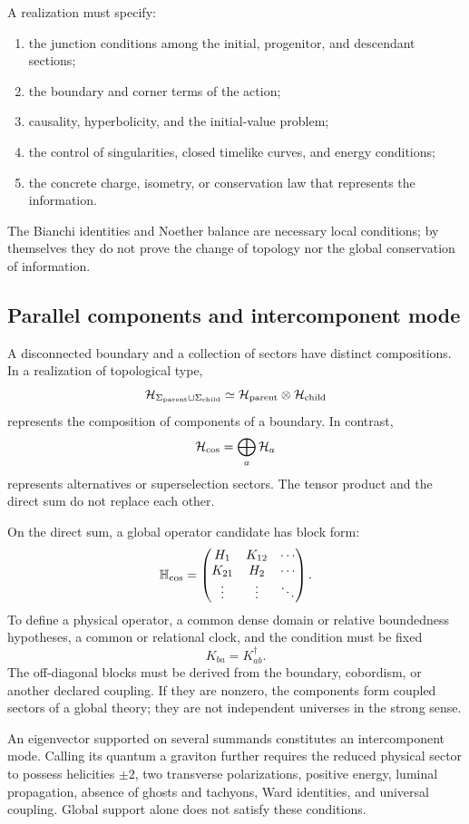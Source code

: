 A realization must specify:
\begin{enumerate}
 \item the junction conditions among the initial, progenitor, and
 descendant sections;
 \item the boundary and corner terms of the action;
 \item causality, hyperbolicity, and the initial-value problem;
 \item the control of singularities, closed timelike curves, and energy
 conditions;
 \item the concrete charge, isometry, or conservation law that represents the
 information.
\end{enumerate}
The Bianchi identities and Noether balance are necessary local
conditions; by themselves they do not prove the change of topology nor the
global conservation of information.

\subsection{Parallel components and intercomponent mode}
\label{sec:componentes-cosmologicas-paralelas}

A disconnected boundary and a collection of sectors have distinct
compositions. In a realization of topological type,
\[
 \mathcal H_{\Sigma_{\rm parent}\sqcup\Sigma_{\rm child}}
 \simeq
 \mathcal H_{\rm parent}\otimes\mathcal H_{\rm child}
\]
represents the composition of components of a boundary. In contrast,
\[
 \mathcal H_{\rm cos}
 =\bigoplus_a\mathcal H_a
\]
represents alternatives or superselection sectors. The tensor product
and the direct sum do not replace each other.

On the direct sum, a global operator candidate has block form:
\[
 \mathbb H_{\rm cos}
 =
 \begin{pmatrix}
 H_1&K_{12}&\cdots\\
 K_{21}&H_2&\cdots\\
 \vdots&\vdots&\ddots
 \end{pmatrix}.
\]
To define a physical operator, a common dense domain or
relative boundedness hypotheses, a common or relational clock, and the condition must be fixed
\[
 K_{ba}=K_{ab}^{\dagger}.
\]
The off-diagonal blocks must be derived from the boundary, cobordism, or
another declared coupling. If they are nonzero, the components form
coupled sectors of a global theory; they are not independent universes in
the strong sense.

An eigenvector supported on several summands constitutes an intercomponent mode. Calling its quantum a graviton further requires the reduced physical sector to possess helicities \(\pm2\), two transverse polarizations, positive energy, luminal propagation, absence of ghosts and tachyons, Ward identities, and universal coupling. Global support alone does not satisfy these conditions.

